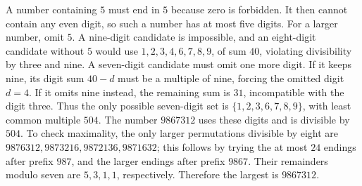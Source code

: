 A number containing $5$ must end in $5$ because zero is forbidden. It then cannot contain any even digit, so such a number has at most five digits. For a larger number, omit $5$.
A nine-digit candidate is impossible, and an eight-digit candidate without $5$ would use $1,2,3,4,6,7,8,9$, of sum $40$, violating divisibility by three and nine. A seven-digit candidate must omit one more digit. If it keeps nine, its digit sum $40-d$ must be a multiple of nine, forcing the omitted digit $d=4$. If it omits nine instead, the remaining sum is $31$, incompatible with the digit three. Thus the only possible seven-digit set is $\{1,2,3,6,7,8,9\}$, with least common multiple $504$.
The number $9867312$ uses these digits and is divisible by $504$. To check maximality, the only larger permutations divisible by eight are $9876312,9873216,9872136,9871632$; this follows by trying the at most $24$ endings after prefix $987$, and the larger endings after prefix $9867$. Their remainders modulo seven are $5,3,1,1$, respectively. Therefore the largest is $\boxed{9867312}$.
